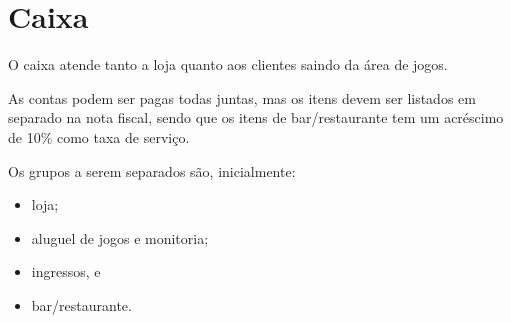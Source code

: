 \chapter{Caixa}
\label{chap:caixa}

O caixa atende tanto a loja quanto aos clientes saindo da área de jogos.

As contas podem ser pagas todas juntas, mas os itens devem ser listados em separado na nota fiscal, sendo que os itens de bar/restaurante tem um acréscimo de 10\% como taxa de serviço.

Os grupos a serem separados são, inicialmente:
\begin{itemize}
    \item loja;
    \item aluguel de jogos e monitoria;
    \item ingressos, e 
    \item bar/restaurante.
\end{itemize}

